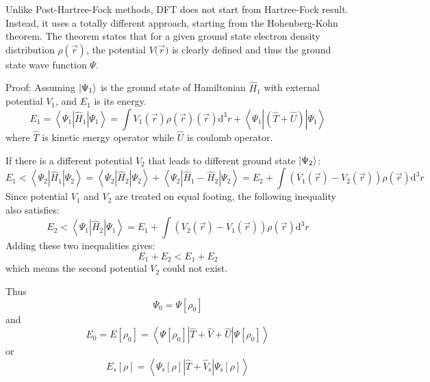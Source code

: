 Unlike Post-Hartree-Fock methods, DFT does not start from Hartree-Fock result.
Instead, it uses a totally different approach, starting from the Hohenberg-Kohn theorem. \cite{hktheorem}
The theorem states that for a given ground state electron density distribution $\rho ({\vec{r}})$, the potential $V ({\vec{r})}$ is clearly defined and thus the ground state wave function $\Psi$.

Proof:
Assuming $\ket{\Psi_1}$ is the ground state of Hamiltonian $\hat{H}_1$ with external potential $V_1$, and $E_1$ is its energy.
\begin{equation}
E_{1}=\left\langle\Psi_{1}\left|\hat{H}_{1}\right| \Psi_{1}\right\rangle=\int V_{1}(\vec{r}) \rho(\vec{r})(\vec{r}) \mathrm{d}^{3} r+\left\langle\Psi_{1}|(\hat{T}+\hat{U})| \Psi_{1}\right\rangle
\end{equation}
where $\hat{T}$ is kinetic energy operator while $\hat{U}$ is coulomb operator.

If there is a different potential $V_2$ that leads to different ground state $\ket{\Psi_2}$:
\begin{equation}
E_{1}<\left\langle\Psi_{2}\left|\hat{H}_{1}\right| \Psi_{2}\right\rangle=\left\langle\Psi_{2}\left|\hat{H}_{2}\right| \Psi_{2}\right\rangle+\left\langle\Psi_{2}\left|\hat{H}_{1}-\hat{H}_{2}\right| \Psi_{2}\right\rangle= E_{2}+\int\left(V_{1}(\vec{r})-V_{2}(\vec{r})\right) \rho(\vec{r}) \mathrm{d}^{3} r
\end{equation}
Since potential $V_1$ and $V_2$ are treated on equal footing, the following inequality also satisfies:
\begin{equation}
E_{2}<\left\langle\Psi_{1}\left|\hat{H}_{2}\right| \Psi_{1}\right\rangle= E_{1}+\int\left(V_{2}(\vec{r})-V_{1}(\vec{r})\right) \rho(\vec{r}) \mathrm{d}^{3} r
\end{equation}
Adding these two inequalities gives:
\begin{equation}
E_{1}+E_{2}<E_{1}+E_{2}
\end{equation}
which means the second potential $V_2$ could not exist.

Thus
\begin{equation}
\Psi_{0}=\Psi[\rho_{0}]
\end{equation}
and
\begin{equation}
E_{0}=E[\rho_{0}]=\left\langle\Psi[\rho_{0}]|\hat{T}+\hat{V}+\hat{U}| \Psi[\rho_{0}]\right\rangle
\end{equation}
or
\begin{equation}
E_{s}[\rho]=\left\langle\Psi_{\mathrm{s}}[\rho]\left|\hat{T}+\hat{V}_{\mathrm{s}}\right| \Psi_{\mathrm{s}}[\rho]\right\rangle
\end{equation}

